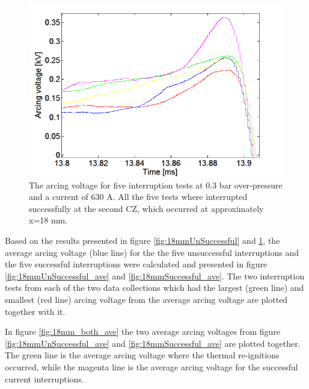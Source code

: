 \documentclass[10pt,b5paper,twoside]{article}
\begin{document}
\begin{figure}[H]
\centering
\includegraphics[scale=0.6, angle =0 ]{Bilder/Results/ArcingVoltage_18_none_reIgnition.PNG}
\caption{The arcing voltage for five interruption tests at 0.3 bar over-pressure and a current of 630 A. All the five tests where interrupted successfully at the second CZ, which occurred at approximately  x=18 mm.} \label{fig:18mmSuccessful}
\end{figure}

Based on the results presented in figure \ref{fig:18mmUnSuccessful} and \ref{fig:18mmSuccessful}, the average arcing voltage (blue line) for the the five unsuccessful interruptions and the five successful interruptions were calculated and presented in figure \ref{fig:18mmUnSuccessful_ave} and \ref{fig:18mmSuccessful_ave}. The two interruption tests from each of the two data collections which had the largest (green line) and smallest (red line) arcing voltage from the average arcing voltage are plotted together with it.


In figure \ref{fig:18mm_both_ave} the two average arcing voltages from figure \ref{fig:18mmUnSuccessful_ave} and \ref{fig:18mmSuccessful_ave} are plotted together. The green line is the average arcing voltage where the thermal re-ignitions occurred, while the magenta line is the average arcing voltage for the successful current interruptions.
\end{document}
